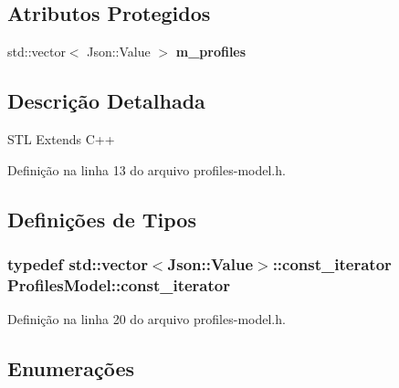 \subsection*{Atributos Protegidos}
\begin{DoxyCompactItemize}
\item 
std\+::vector$<$ Json\+::\+Value $>$ {\bf m\+\_\+profiles}
\end{DoxyCompactItemize}


\subsection{Descrição Detalhada}
S\+TL Extends C++ 

Definição na linha 13 do arquivo profiles-\/model.\+h.



\subsection{Definições de Tipos}
\subsubsection[{const\+\_\+iterator}]{\setlength{\rightskip}{0pt plus 5cm}typedef std\+::vector$<$Json\+::\+Value$>$\+::{\bf const\+\_\+iterator} {\bf Profiles\+Model\+::const\+\_\+iterator}}\label{class_profiles_model_ad4a9f35b1b997b3cef78cc000ae21941}


Definição na linha 20 do arquivo profiles-\/model.\+h.



\subsection{Enumerações}
